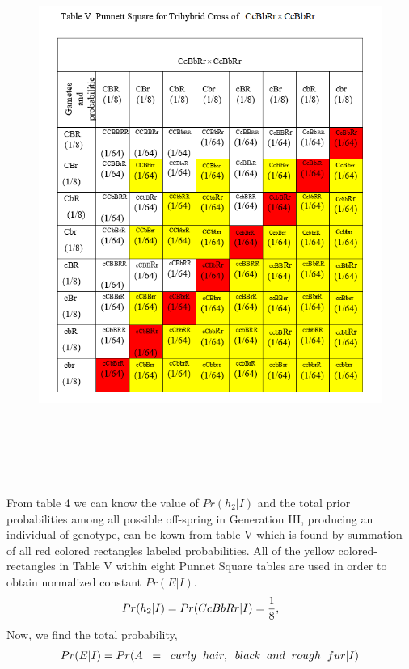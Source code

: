 \documentclass{article}
\begin{document}
\begin{itemize}
\begin{figure}
	\includegraphics[height=18cm,width=16cm]{table5}
\end{figure}
From table 4 we can know the value of $ Pr(h_2|I)$ and the total prior probabilities among all possible off-spring in Generation III, producing an individual of genotype, can be kown from table V which is found by summation of all red colored rectangles labeled probabilities. All of the yellow colored-rectangles in Table V within eight Punnet Square tables are used in order to obtain normalized constant $ Pr(E|I). $\\
\begin{align*}
Pr(h_2|I) = Pr(CcBbRr|I) = \dfrac{1}{8},\hspace{6mm}   	 
\end{align*} 
Now, we find the total probability,
\begin{align*}
Pr(E|I) &= Pr(A\hspace{2mm}=\hspace{2mm}curly\hspace{2mm} hair,\hspace{2mm}black\hspace{2mm}and \hspace{2mm} rough\hspace{2mm}fur|I)\\

\end{align*}
\end{itemize}
\end{document}
